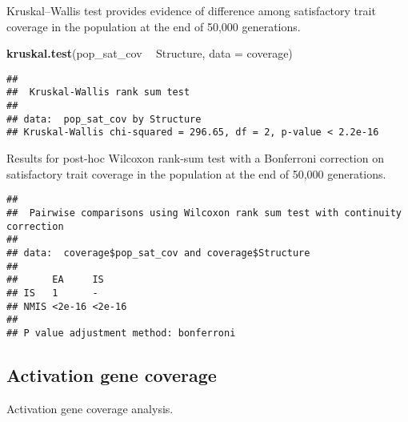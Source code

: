 \documentclass[]{book}
\newenvironment{Shaded}{\begin{snugshade}}{\end{snugshade}}
\newcommand{\DataTypeTok}[1]{\textcolor[rgb]{0.13,0.29,0.53}{#1}}
\newcommand{\KeywordTok}[1]{\textcolor[rgb]{0.13,0.29,0.53}{\textbf{#1}}}
\newcommand{\NormalTok}[1]{#1}
\newcommand{\OperatorTok}[1]{\textcolor[rgb]{0.81,0.36,0.00}{\textbf{#1}}}
\newcommand{\OtherTok}[1]{\textcolor[rgb]{0.56,0.35,0.01}{#1}}
\newcommand{\StringTok}[1]{\textcolor[rgb]{0.31,0.60,0.02}{#1}}
\begin{document}
Kruskal--Wallis test provides evidence of difference among satisfactory trait coverage in the population at the end of 50,000 generations.

\begin{Shaded}
\begin{Highlighting}[]
\KeywordTok{kruskal.test}\NormalTok{(pop_sat_cov }\OperatorTok{~}\StringTok{ }\NormalTok{Structure, }\DataTypeTok{data =}\NormalTok{ coverage)}
\end{Highlighting}
\end{Shaded}

\begin{verbatim}
## 
##  Kruskal-Wallis rank sum test
## 
## data:  pop_sat_cov by Structure
## Kruskal-Wallis chi-squared = 296.65, df = 2, p-value < 2.2e-16
\end{verbatim}

Results for post-hoc Wilcoxon rank-sum test with a Bonferroni correction on satisfactory trait coverage in the population at the end of 50,000 generations.

\begin{Shaded}
\end{Shaded}

\begin{verbatim}
## 
##  Pairwise comparisons using Wilcoxon rank sum test with continuity correction 
## 
## data:  coverage$pop_sat_cov and coverage$Structure 
## 
##      EA     IS    
## IS   1      -     
## NMIS <2e-16 <2e-16
## 
## P value adjustment method: bonferroni
\end{verbatim}

\hypertarget{activation-gene-coverage-1}{%
\subsection{Activation gene coverage}\label{activation-gene-coverage-1}}

Activation gene coverage analysis.
\end{document}
